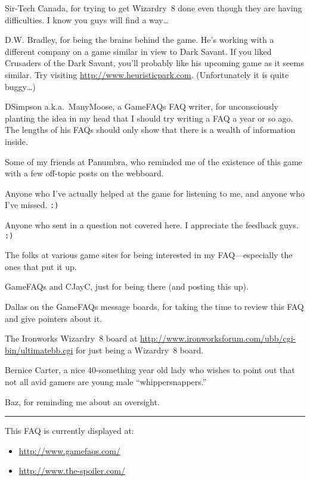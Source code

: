 \documentclass[10pt,twoside,openright]{report}
\providecommand{\tightlist}{%
  \setlength{\itemsep}{0pt}\setlength{\parskip}{0pt}}
\newcommand{\WviiNeedSpace}{\Needspace*{4\baselineskip+\parskip}}
\begin{document}
Sir-Tech Canada, for trying to get Wizardry~8 done even though they are
having difficulties. I know you guys will find a way\ldots{}

D.W. Bradley, for being the brains behind the game. He's working with a
different company on a game similar in view to Dark Savant. If you liked
Crusaders of the Dark Savant, you'll probably like his upcoming game as
it seems similar. Try visiting \url{http://www.heuristicpark.com}.
(Unfortunately it is quite buggy\ldots{})

DSimpson a.k.a.\ ManyMoose, a GameFAQs FAQ writer, for unconsciously
planting the idea in my head that I should try writing a FAQ a year or
so ago. The lengths of his FAQs should only show that there is a wealth
of information inside.

Some of my friends at Panumbra, who reminded me of the existence of this
game with a few off-topic posts on the webboard.

Anyone who I've actually helped at the game for listening to me, and
anyone who I've missed. \verb|:)|

Anyone who sent in a question not covered here. I appreciate the
feedback guys. \verb|:)|

The folks at various game sites for being interested in my
FAQ---especially the ones that put it up.

GameFAQs and CJayC, just for being there (and posting this up).

Dallas on the GameFAQs message boards, for taking the time to review
this FAQ and give pointers about it.

The Ironworks Wizardry~8 board at
\url{http://www.ironworksforum.com/ubb/cgi-bin/ultimatebb.cgi} for just
being a Wizardry~8 board.

Bernice Carter, a nice 40-something year old lady who wishes to point
out that not all avid gamers are young male ``whippersnappers.''

Baz, for reminding me about an oversight.

\begin{center}\rule{0.5\linewidth}{\linethickness}\end{center}

\WviiNeedSpace{}This FAQ is currently displayed at:%
\begin{itemize}
\tightlist
\item
  \url{http://www.gamefaqs.com/}
\item
  \url{http://www.the-spoiler.com/}
\end{itemize}
\end{document}

